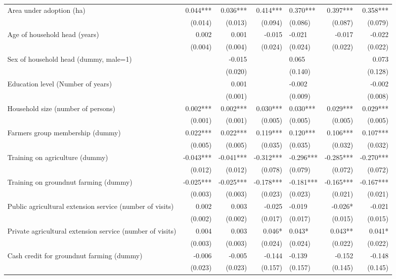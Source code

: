 \documentclass[
]{article}
\begin{document}
\begin{landscape}
\begin{longtable}[t]{lrrrlrr}
\endfoot
\bottomrule
\endlastfoot
Area under adoption (ha) & 0.044*** & 0.036*** & 0.414*** & 0.370*** & 0.397*** & 0.358***\\
 & (0.014) & (0.013) & (0.094) & (0.086) & (0.087) & (0.079)\\
Age of household head (years) & 0.002 & 0.001 & -0.015 & -0.021 & -0.017 & -0.022\\
 & (0.004) & (0.004) & (0.024) & (0.024) & (0.022) & (0.022)\\
Sex of household head (dummy, male=1) &  & -0.015 &  & 0.065 &  & 0.073\\
 &  & (0.020) &  & (0.140) &  & (0.128)\\
Education level (Number of years) &  & 0.001 &  & -0.002 &  & -0.002\\
 &  & (0.001) &  & (0.009) &  & (0.008)\\
Household size (number of persons) & 0.002*** & 0.002*** & 0.030*** & 0.030*** & 0.029*** & 0.029***\\
 & (0.001) & (0.001) & (0.005) & (0.005) & (0.005) & (0.005)\\
Farmers group membership (dummy) & 0.022*** & 0.022*** & 0.119*** & 0.120*** & 0.106*** & 0.107***\\
 & (0.005) & (0.005) & (0.035) & (0.035) & (0.032) & (0.032)\\
Training on agriculture (dummy) & -0.043*** & -0.041*** & -0.312*** & -0.296*** & -0.285*** & -0.270***\\
 & (0.012) & (0.012) & (0.078) & (0.079) & (0.072) & (0.072)\\
Training on groundnut farming (dummy) & -0.025*** & -0.025*** & -0.178*** & -0.181*** & -0.165*** & -0.167***\\
 & (0.003) & (0.003) & (0.023) & (0.023) & (0.021) & (0.021)\\
Public agricultural extension service (number of visits) & 0.002 & 0.003 & -0.025 & -0.019 & -0.026* & -0.021\\
 & (0.002) & (0.002) & (0.017) & (0.017) & (0.015) & (0.015)\\
Private agricultural extension service (number of visits) & 0.004 & 0.003 & 0.046* & 0.043* & 0.043** & 0.041*\\
 & (0.003) & (0.003) & (0.024) & (0.024) & (0.022) & (0.022)\\
Cash credit for groundnut farming (dummy) & -0.006 & -0.005 & -0.144 & -0.139 & -0.152 & -0.148\\
 & (0.023) & (0.023) & (0.157) & (0.157) & (0.145) & (0.145)\\

\end{longtable}
\end{landscape}
\end{document}
